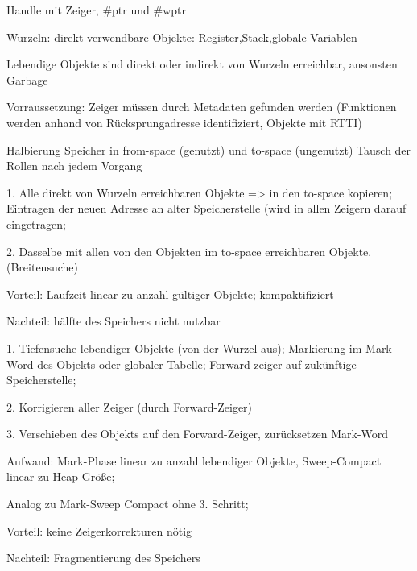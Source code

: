  Handle mit Zeiger, \#ptr und \#wptr

Wurzeln: direkt verwendbare Objekte: Register,Stack,globale Variablen

Lebendige Objekte sind direkt oder indirekt von Wurzeln erreichbar, ansonsten Garbage

Vorraussetzung: Zeiger müssen durch Metadaten gefunden werden (Funktionen werden anhand von Rücksprungadresse identifiziert, Objekte mit RTTI)

Halbierung Speicher in from-space (genutzt) und to-space (ungenutzt)
Tausch der Rollen nach jedem Vorgang

1. Alle direkt von Wurzeln erreichbaren Objekte => in den to-space kopieren; Eintragen der neuen Adresse an alter Speicherstelle (wird in allen Zeigern darauf eingetragen; 

2. Dasselbe mit allen von den Objekten im to-space erreichbaren Objekte. (Breitensuche)

Vorteil: Laufzeit linear zu anzahl gültiger Objekte; kompaktifiziert

Nachteil: hälfte des Speichers nicht nutzbar


1. Tiefensuche lebendiger Objekte (von der Wurzel aus); Markierung im Mark-Word des Objekts oder globaler Tabelle; Forward-zeiger auf zukünftige Speicherstelle;

2. Korrigieren aller Zeiger (durch Forward-Zeiger)

3. Verschieben des Objekts auf den Forward-Zeiger, zurücksetzen Mark-Word 

Aufwand: Mark-Phase linear zu anzahl lebendiger Objekte, Sweep-Compact linear zu Heap-Größe;

Analog zu Mark-Sweep Compact ohne 3. Schritt; 

Vorteil: keine Zeigerkorrekturen nötig

Nachteil: Fragmentierung des Speichers

